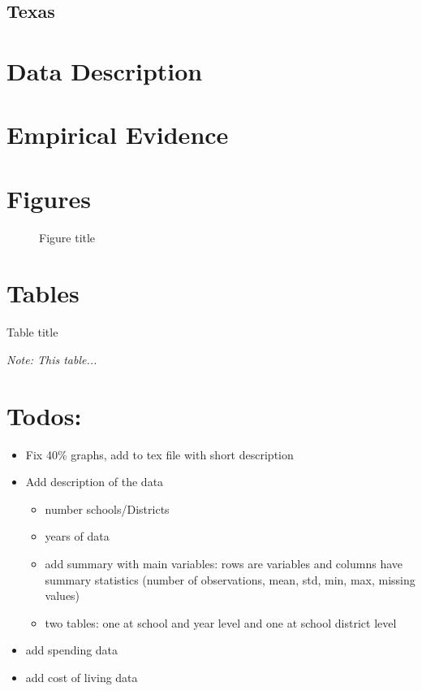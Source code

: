 \documentclass[12pt]{article}
\begin{document}
\subsection{Texas}

\section{Data Description}

\section{Empirical Evidence}

\section{Figures}

\begin{figure}[tbh]
	\caption{Figure title}\label{fig1}
\end{figure}

\section{Tables}

\begin{table}[tbh]
    \caption{Table title}
    \label{table1}
        \begin{center}
        \end{center}
    \textit{\scriptsize{}Note: This table...}{\scriptsize \par}
    \end{table}

\section{Todos:}

\begin{itemize}
	\item Fix 40\% graphs, add to tex file with short description
	\item Add description of the data
	\begin{itemize}
		\item number schools/Districts
		\item years of data
		\item add summary with main variables: rows are variables and columns have summary statistics (number of observations, mean, std, min, max, missing values)
		\item two tables: one at school and year level and one at school district level
	\end{itemize} 
	\item add spending data
	\item add cost of living data
\end{itemize}
\end{document}
